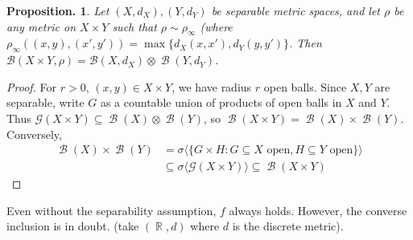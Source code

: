 \documentclass[11pt, a4paper]{memoir}
\DeclareMathOperator{\R}{{\mathbb{R}}}
\theoremstyle{change}
\newtheorem{proposition}[theorem]{Proposition.}
\theoremstyle{plain}
\theoremstyle{nonumberplain}
\newtheorem{proof}{Proof}
\DeclareMathOperator{\B}{{\mathcal{B}}}
\begin{document}
\begin{proposition}
    Let $(X,d_X),(Y,d_Y)$ be separable metric spaces, and let $\rho$ be any metric on $X\times Y$ such that $\rho\sim\rho_{\infty}$ (where $\rho_\infty((x,y),(x',y'))=\max\{d_X(x,x'),d_Y(y,y')\}$.
    Then $\mathcal{B}(X\times Y,\rho)=\mathcal{B}(X,d_X)\otimes\B(Y,d_Y)$.
\end{proposition}
\begin{proof}
    For $r>0$, $(x,y)\in X\times Y$, we have radius $r$ open balls.
    Since $X,Y$ are separable, write $G$ as a countable union of products of open balls in $X$ and $Y$.
    Thus $\mathcal{G}(X\times Y)\subseteq\B(X)\otimes\B(Y)$, so $\B(X\times Y)=\B(X)\times\B(Y)$.
    Conversely,
    \begin{align*}
        \B(X)\times\B(Y)&=\sigma\langle\{G\times H:G\subseteq X\text{ open},H\subseteq Y\text{ open}\}\rangle\\
                        &\subseteq\sigma\langle\mathcal{G}(X\times Y)\rangle\subseteq\B(X\times Y)
    \end{align*}
\end{proof}
Even without the separability assumption, $f$ always holds.
However, the converse inclusion is in doubt. (take $(\R,d)$ where $d$ is the discrete metric).
\end{document}
